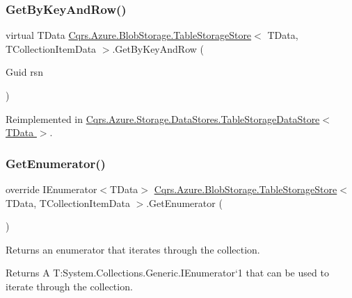 \subsubsection{\texorpdfstring{Get\+By\+Key\+And\+Row()}{GetByKeyAndRow()}}
{\footnotesize\ttfamily virtual T\+Data \hyperlink{classCqrs_1_1Azure_1_1BlobStorage_1_1TableStorageStore}{Cqrs.\+Azure.\+Blob\+Storage.\+Table\+Storage\+Store}$<$ T\+Data, T\+Collection\+Item\+Data $>$.Get\+By\+Key\+And\+Row (\begin{DoxyParamCaption}\item[{Guid}]{rsn }\end{DoxyParamCaption})\hspace{0.3cm}{\ttfamily [virtual]}}



Reimplemented in \hyperlink{classCqrs_1_1Azure_1_1Storage_1_1DataStores_1_1TableStorageDataStore_a61e3fc6404283606ec41a5e5a3c72ac8}{Cqrs.\+Azure.\+Storage.\+Data\+Stores.\+Table\+Storage\+Data\+Store$<$ T\+Data $>$}.

\mbox{\label{classCqrs_1_1Azure_1_1BlobStorage_1_1TableStorageStore_ac3e684b894e739f8936e537806952c49}} 
\subsubsection{\texorpdfstring{Get\+Enumerator()}{GetEnumerator()}}
{\footnotesize\ttfamily override I\+Enumerator$<$T\+Data$>$ \hyperlink{classCqrs_1_1Azure_1_1BlobStorage_1_1TableStorageStore}{Cqrs.\+Azure.\+Blob\+Storage.\+Table\+Storage\+Store}$<$ T\+Data, T\+Collection\+Item\+Data $>$.Get\+Enumerator (\begin{DoxyParamCaption}{ }\end{DoxyParamCaption})\hspace{0.3cm}{\ttfamily [virtual]}}



Returns an enumerator that iterates through the collection. 

\begin{DoxyReturn}{Returns}
A T\+:\+System.\+Collections.\+Generic.\+I\+Enumerator`1 that can be used to iterate through the collection. 
\end{DoxyReturn}


